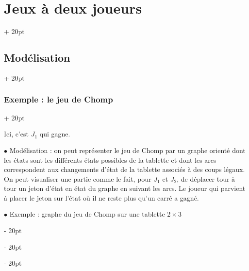 \documentclass[a4paper, 12pt, twoside]{article}
\newcommand{\ind}[1][20pt]{\advance\leftskip + #1}
\newcommand{\deind}[1][20pt]{\advance\leftskip - #1}
\newenvironment{indt}[2][20pt]{#2 \par \ind[#1]}{\par \deind} %
\begin{document}
\begin{indt}{\section{Jeux à deux joueurs}}
\begin{indt}{\subsection{Modélisation}}
\begin{indt}{\subsubsection{Exemple : le jeu de Chomp}}
\begin{center}
                \end{center}

                Ici, c'est $J_1$ qui gagne.

                \vspace{12pt}
                
                $\bullet$ Modélisation : on peut représenter le jeu de Chomp par un graphe orienté dont les états sont les différents états possibles de la tablette et dont les arcs correspondent aux changements d'état de la tablette associés à des coups légaux. On peut visualiser une partie comme le fait, pour $J_1$ et $J_2$, de déplacer tour à tour un jeton d'état en état du graphe en suivant les arcs.
                Le joueur qui parvient à placer le jeton sur l'état où il ne reste plus qu'un carré a gagné.

                \vspace{12pt}
                
                $\bullet$ Exemple : graphe du jeu de Chomp sur une tablette $2 \times 3$


\end{indt}
\end{indt}
\end{indt}
\end{document}
